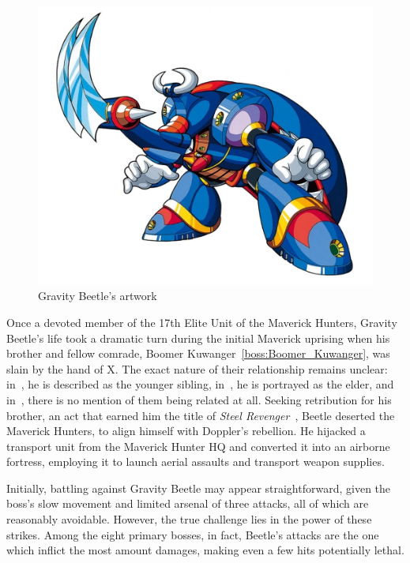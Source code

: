 \begin{figure}[htp]
	\centering
	\includegraphics[height=\portraitsize]{figures/X3/Gravity_beetle/gravitybeetle.png}
	\caption{Gravity Beetle's artwork~\cite{book:MMX_Complete_art}}
\end{figure}

Once a devoted member of the 17th Elite Unit of the Maverick Hunters, Gravity Beetle's life took a dramatic turn during the initial Maverick uprising when his brother and fellow comrade, Boomer Kuwanger~\ref{boss:Boomer_Kuwanger}, was slain by the hand of X. The exact nature of their relationship remains unclear: in~\cite{book:Compendium}, he is described as the younger sibling, in~\cite{wayback:X3_resources}, he is portrayed as the elder, and in~\cite{Xcoll1:Manual_X3}, there is no mention of them being related at all. Seeking retribution for his brother, an act that earned him the title of \textit{Steel Revenger}~\cite{book:MMX_Complete_art}, Beetle deserted the Maverick Hunters, to align himself with Doppler's rebellion. He hijacked a transport unit from the Maverick Hunter HQ and converted it into an airborne fortress, employing it to launch aerial assaults and transport weapon supplies\cite{Xcoll1:Manual_X3,wayback:X3_resources,wiki:Gravity_beetle}.
 
Initially, battling against Gravity Beetle may appear straightforward, given the boss's slow movement and limited arsenal of three attacks, all of which are reasonably avoidable. However, the true challenge lies in the power of these strikes. Among the eight primary bosses, in fact, Beetle's attacks are the one which inflict the most amount damages, making even a few hits potentially lethal.

